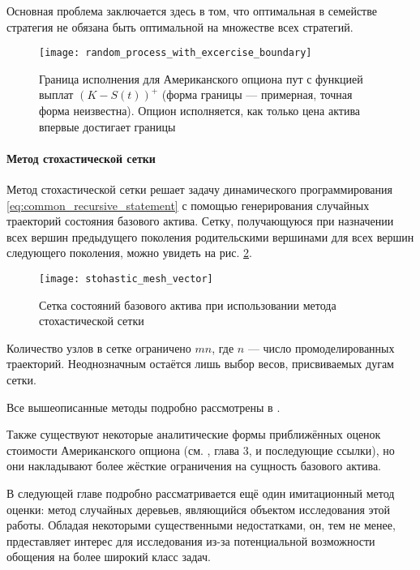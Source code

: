 Основная проблема заключается здесь в том, что оптимальная в семействе стратегия не обязана быть оптимальной на множестве всех стратегий.
\begin{figure}[htb]
\centering
\texttt{[image: random\_process\_with\_excercise\_boundary]}
\caption{Граница исполнения для Американского опциона пут с функцией выплат $\left(K-S(t)\right)^+$ (форма границы --- примерная, точная форма неизвестна). Опцион исполняется, как только цена актива впервые достигает границы}
\label{fig:excercise_boundary}
\end{figure}

\paragraph{Метод стохастической сетки}
Метод стохастической сетки решает задачу динамического программирования \eqref{eq:common_recursive_statement} с помощью генерирования случайных траекторий состояния базового актива. Сетку, получающуюся при назначении всех вершин предыдущего поколения родительскими вершинами для всех вершин следующего поколения, можно увидеть на рис. \ref{fig:stohastic_mesh}.
\begin{figure}[htbp]
\centering
\texttt{[image: stohastic\_mesh\_vector]}
\caption{Сетка состояний базового актива при использовании метода стохастической сетки}
\label{fig:stohastic_mesh}
\end{figure}
Количество узлов в сетке ограничено $mn$, где $n$ --- число промоделированных траекторий. Неоднозначным остаётся лишь выбор весов, присвиваемых дугам сетки.

Все вышеописанные методы подробно рассмотрены в \cite{Glasserman2004}.

Также существуют некоторые аналитические формы приближённых оценок стоимости Американского опциона (см. \cite{Haug2007}, глава 3, и последующие ссылки), но они накладывают более жёсткие ограничения на сущность базового актива.

В следующей главе подробно рассматривается ещё один имитационный метод оценки: метод случайных деревьев, являющийся объектом исследования этой работы. Обладая некоторыми существенными недостатками, он, тем не менее, прдеставляет интерес для исследования из-за потенциальной возможности обощения на более широкий класс задач.
